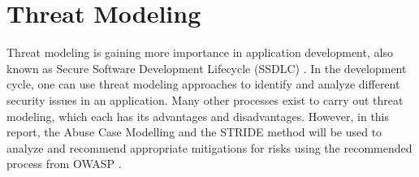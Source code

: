 \chapter{Threat Modeling}
\label{chap:threat_modeling}
Threat modeling is gaining more importance in application development, also known as Secure Software Development Lifecycle (SSDLC) \citep{snyk_2022}. In the development cycle, one can use threat modeling approaches to identify and analyze different security issues in an application. Many other processes exist to carry out threat modeling, which each has its advantages and disadvantages. However, in this report, the Abuse Case Modelling and the STRIDE method will be used to analyze and recommend appropriate mitigations for risks using the recommended process from OWASP \citep{owasp_threat_model_process}.

